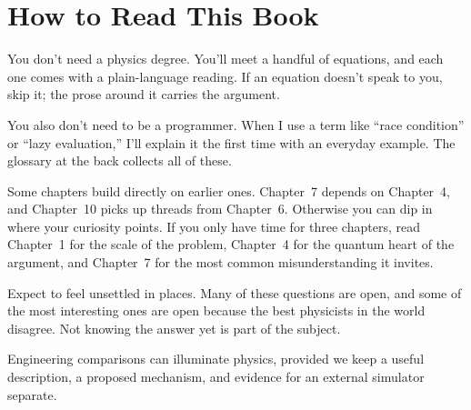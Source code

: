 \section{How to Read This Book}

You don't need a physics degree. You'll meet a handful of equations, and each one comes with a plain-language reading. If an equation doesn't speak to you, skip it; the prose around it carries the argument.

You also don't need to be a programmer. When I use a term like ``race condition'' or ``lazy evaluation,'' I'll explain it the first time with an everyday example. The glossary at the back collects all of these.

Some chapters build directly on earlier ones. Chapter~7 depends on Chapter~4, and Chapter~10 picks up threads from Chapter~6. Otherwise you can dip in where your curiosity points. If you only have time for three chapters, read Chapter~1 for the scale of the problem, Chapter~4 for the quantum heart of the argument, and Chapter~7 for the most common misunderstanding it invites.

Expect to feel unsettled in places. Many of these questions are open, and some of the most interesting ones are open because the best physicists in the world disagree. Not knowing the answer yet is part of the subject.

\begin{keytakeawaybox}
Engineering comparisons can illuminate physics, provided we keep a useful description, a proposed mechanism, and evidence for an external simulator separate.
\end{keytakeawaybox}
